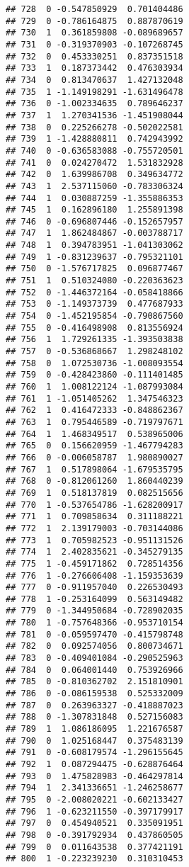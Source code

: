 \documentclass[
]{article}
\begin{document}
\begin{verbatim}
## 728  0 -0.547850929  0.701404486
## 729  0 -0.786164875  0.887870619
## 730  1  0.361859808 -0.089689657
## 731  0 -0.319370903 -0.107268745
## 732  0  0.453330251  0.837351518
## 733  1  0.187373442  0.476303934
## 734  0  0.813470637  1.427132048
## 735  1 -1.149198291 -1.631496478
## 736  0 -1.002334635  0.789646237
## 737  1  1.270341536 -1.451908044
## 738  0  0.225266278 -0.502022581
## 739  1 -1.428880811  0.742943992
## 740  0 -0.636583088 -0.755720501
## 741  0  0.024270472  1.531832928
## 742  0  1.639986708  0.349634772
## 743  1  2.537115060 -0.783306324
## 744  1  0.030887259 -1.355886353
## 745  1  0.162896180  1.255891398
## 746  0 -0.696807446 -0.152657957
## 747  1  1.862484867 -0.003788717
## 748  1  0.394783951 -1.041303062
## 749  1 -0.831239637 -0.795321101
## 750  0 -1.576717825  0.096877467
## 751  1  0.510324080 -0.220363623
## 752  0 -1.446372164 -0.058418866
## 753  0 -1.149373739  0.477687933
## 754  0 -1.452195854 -0.790867560
## 755  0 -0.416498908  0.813556924
## 756  1  1.729261335 -1.393503838
## 757  0 -0.536868667  1.298248102
## 758  0  1.072530736 -1.008093554
## 759  0 -0.428423860 -0.111401485
## 760  1  1.008122124 -1.087993084
## 761  1 -1.051405262  1.347546323
## 762  1  0.416472333 -0.848862367
## 763  1  0.795446589 -0.719797671
## 764  1  1.468349517  0.538965006
## 765  0  0.156620959 -1.467794283
## 766  0 -0.006058787  1.980890027
## 767  1  0.517898064 -1.679535795
## 768  0 -0.812061260  1.860440239
## 769  1  0.518137819  0.082515656
## 770  1 -0.537654786 -1.628200917
## 771  1  0.709858634  0.311188221
## 772  1  2.139179003 -0.703144086
## 773  1  0.705982523 -0.951131526
## 774  1  2.402835621 -0.345279135
## 775  1 -0.459171862  0.728514356
## 776  1 -0.276606408 -1.159353639
## 777  0 -0.911957040  0.226530493
## 778  1 -0.253164099  0.563149482
## 779  0 -1.344950684 -0.728902035
## 780  1 -0.757648366 -0.953710154
## 781  0 -0.059597470 -0.415798748
## 782  0  0.092574056  0.800734671
## 783  0 -0.409401084 -0.290525963
## 784  0  0.064001440  0.753926966
## 785  0 -0.810362702  2.151810901
## 786  0 -0.086159538  0.525332009
## 787  0  0.263963327 -0.418887023
## 788  0 -1.307831848  0.527156083
## 789  1  1.086186095  1.221676587
## 790  0  1.025168447  0.375483139
## 791  0 -0.608179574 -1.296155645
## 792  1  0.087294475 -0.628876464
## 793  0  1.475828983 -0.464297814
## 794  1  2.341336651 -1.246258677
## 795  0 -2.008020221 -0.602133427
## 796  1 -0.623211550 -0.397179917
## 797  0  0.454940521  0.335091951
## 798  0 -0.391792934  0.437860505
## 799  0  0.011643538  0.377421191
## 800  1 -0.223239230  0.310310453

\end{verbatim}
\end{document}
